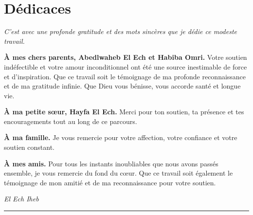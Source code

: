 \chapter*{Dédicaces}

\begin{center}
\begin{minipage}{0.83\textwidth}
\itshape
C’est avec une profonde gratitude et des mots sincères que je dédie ce modeste travail.

\medskip
\textbf{À mes chers parents, Abedlwaheb El Ech et Habiba Omri.} Votre soutien indéfectible et votre amour inconditionnel ont été une source inestimable de force et d’inspiration. Que ce travail soit le témoignage de ma profonde reconnaissance et de ma gratitude infinie. Que Dieu vous bénisse, vous accorde santé et longue vie.

\medskip
\textbf{À ma petite sœur, Hayfa El Ech.} Merci pour ton soutien, ta présence et tes encouragements tout au long de ce parcours.

\medskip
\textbf{À ma famille.} Je vous remercie pour votre affection, votre confiance et votre soutien constant.

\medskip
\textbf{À mes amis.} Pour tous les instants inoubliables que nous avons passés ensemble, je vous remercie du fond du cœur. Que ce travail soit également le témoignage de mon amitié et de ma reconnaissance pour votre soutien.
\end{minipage}
\end{center}

\vfill
\begin{flushright}
\textit{\Large El Ech Iheb}\\[-1mm]
\rule{4.5cm}{0.35pt}
\end{flushright}
